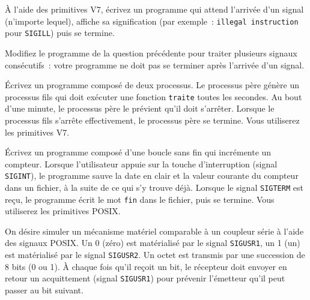 %


% 


\question

À l'aide des primitives V7, écrivez un programme qui attend l'arrivée
d'un signal (n'importe lequel), affiche sa signification (par
exemple~:  {\tt illegal instruction} pour {\tt SIGILL}) puis se
termine.


\question

Modifiez le programme de la question précédente pour traiter plusieurs
signaux consécutifs~: votre programme ne doit pas se terminer après
l'arrivée d'un signal.


\question

Écrivez un programme composé de deux processus.  Le processus père
génère un processus fils qui doit exécuter une fonction {\tt traite}
toutes les secondes.  Au bout d'une minute, le processus père le
prévient qu'il doit s'arrêter.  Lorsque le processus fils s'arrête
effectivement, le processus père se termine. Vous utiliserez les
primitives V7.


\question

Écrivez un programme composé d'une boucle sans fin qui
incrémente un compteur. Lorsque l'utilisateur appuie sur la touche
d'interruption (signal {\tt SIGINT}), le programme sauve la date en
clair et la valeur courante du compteur dans un fichier,
à la suite de ce qui s'y trouve déjà.
Lorsque le signal {\tt SIGTERM} est reçu, le programme écrit
le mot {\tt fin} dans le fichier, puis se termine. Vous utiliserez les
primitives POSIX.


\question

On désire simuler un mécanisme matériel comparable à un coupleur série
à l'aide des signaux POSIX. Un 0 (zéro) est matérialisé par le signal
{\tt SIGUSR1}, un 1 (un) est matérialisé par le signal {\tt SIGUSR2}.
Un octet est transmis par une succession de 8 bits (0 ou 1).
À chaque fois qu'il reçoit un bit, le récepteur doit envoyer en
retour un acquittement (signal {\tt SIGUSR1}) pour prévenir l'émetteur
qu'il peut passer au bit suivant.

